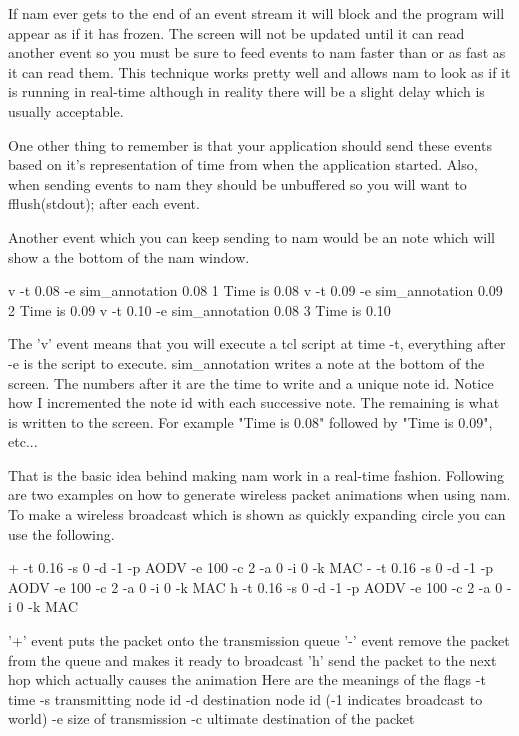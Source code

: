 If nam ever gets to the end of an
event stream it will block and the program will appear as if it
has frozen.  The screen will not be updated until it can read another event
so you must be sure to feed events to nam faster than or as fast as it
can read them.  This technique works pretty well and allows nam to look
as if it is running in real-time although in reality there will be a
slight delay which is usually acceptable.

One other thing to remember is that your application should send these events
based on it's representation of time from when the application started.
Also, when sending events to nam they should be unbuffered so you 
will want to fflush(stdout); after each event.

Another event which you can keep sending to nam would be an note which
will show a the bottom of the nam window.
\begin{program}
v -t 0.08 -e sim\_annotation 0.08 1 Time is 0.08
v -t 0.09 -e sim\_annotation 0.09 2 Time is 0.09
v -t 0.10 -e sim\_annotation 0.08 3 Time is 0.10
\end{program}

The 'v' event means that you will execute a tcl script at time -t,
everything after -e is the script to execute.  sim\_annotation writes a
note at the bottom of the screen.  The numbers after it are the time to
write and a unique note id.  Notice how I incremented the note id with
each successive note.   The remaining is what is written to the screen.
For example "Time is 0.08" followed by "Time is 0.09", etc...

That is the basic idea behind making nam work in a real-time fashion.
Following are two examples on how to generate wireless packet animations
when using nam.  To make a wireless broadcast which is shown as quickly
expanding circle you can use the following.

\begin{program}
+ -t 0.16 -s 0 -d -1 -p AODV -e 100 -c 2 -a 0 -i 0 -k MAC
- -t 0.16 -s 0 -d -1 -p AODV -e 100 -c 2 -a 0 -i 0 -k MAC
h -t 0.16 -s 0 -d -1 -p AODV -e 100 -c 2 -a 0 -i 0 -k MAC
\end{program}

'+' event puts the packet onto the transmission queue
'-' event remove the packet from the queue and makes it ready to
broadcast
'h' send the packet to the next hop which actually causes the animation
Here are the meanings of the flags
  -t time
  -s transmitting node id
  -d destination node id (-1 indicates broadcast to world)
  -e size of transmission
  -c ultimate destination of the packet

